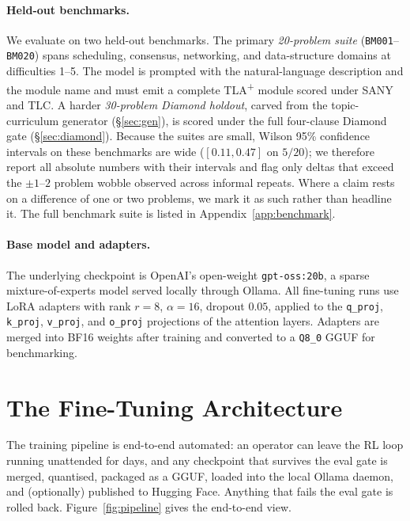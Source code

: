 \documentclass[11pt]{article}
\begin{document}
\paragraph{Held-out benchmarks.}
We evaluate on two held-out benchmarks.  The primary \emph{20-problem
suite} (\texttt{BM001}--\texttt{BM020}) spans scheduling, consensus,
networking, and data-structure domains at difficulties 1--5.  The model
is prompted with the natural-language description and the module name
and must emit a complete TLA\textsuperscript{+} module scored under
SANY and TLC.  A harder \emph{30-problem Diamond holdout}, carved
from the topic-curriculum generator (\S\ref{sec:gen}), is scored under
the full four-clause Diamond gate (\S\ref{sec:diamond}).
Because the suites are small, Wilson 95\% confidence intervals on
these benchmarks are wide ($[0.11,0.47]$ on $5/20$); we therefore
report all absolute numbers with their intervals and flag only
deltas that exceed the $\pm 1$--$2$ problem wobble observed across
informal repeats.  Where a claim rests on a difference of one or
two problems, we mark it as such rather than headline it.
The full benchmark suite is listed in Appendix~\ref{app:benchmark}.

\paragraph{Base model and adapters.}  The underlying checkpoint is
OpenAI's open-weight \texttt{gpt-oss:20b}, a sparse
mixture-of-experts model served locally through Ollama.  All
fine-tuning runs use LoRA adapters with rank $r\!=\!8$,
$\alpha\!=\!16$, dropout $0.05$, applied to the
\texttt{q\_proj}, \texttt{k\_proj}, \texttt{v\_proj}, and
\texttt{o\_proj} projections of the attention layers.  Adapters are
merged into BF16 weights after training and converted to a
\texttt{Q8\_0} GGUF for benchmarking.

\section{The Fine-Tuning Architecture}
\label{sec:arch}

The training pipeline is end-to-end automated: an operator can leave
the RL loop running unattended for days, and any checkpoint that
survives the eval gate is merged, quantised, packaged as a GGUF,
loaded into the local Ollama daemon, and (optionally) published to
Hugging Face.  Anything that fails the eval gate is rolled back.
Figure~\ref{fig:pipeline} gives the end-to-end view.
\end{document}
